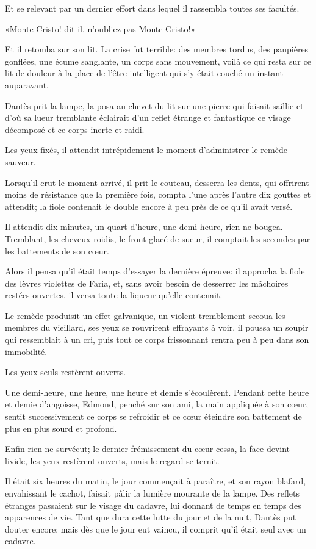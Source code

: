 Et se relevant par un dernier effort dans lequel il rassembla toutes ses facultés.

«Monte-Cristo! dit-il, n'oubliez pas Monte-Cristo!»

Et il retomba sur son lit. La crise fut terrible: des membres tordus, des paupières gonflées, une écume sanglante, un corps sans mouvement, voilà ce qui resta sur ce lit de douleur à la place de l'être intelligent qui s'y était couché un instant auparavant.

Dantès prit la lampe, la posa au chevet du lit sur une pierre qui faisait saillie et d'où sa lueur tremblante éclairait d'un reflet étrange et fantastique ce visage décomposé et ce corps inerte et raidi.

Les yeux fixés, il attendit intrépidement le moment d'administrer le remède sauveur.

Lorsqu'il crut le moment arrivé, il prit le couteau, desserra les dents, qui offrirent moins de résistance que la première fois, compta l'une après l'autre dix gouttes et attendit; la fiole contenait le double encore à peu près de ce qu'il avait versé.

Il attendit dix minutes, un quart d'heure, une demi-heure, rien ne bougea. Tremblant, les cheveux roidis, le front glacé de sueur, il comptait les secondes par les battements de son cœur.

Alors il pensa qu'il était temps d'essayer la dernière épreuve: il approcha la fiole des lèvres violettes de Faria, et, sans avoir besoin de desserrer les mâchoires restées ouvertes, il versa toute la liqueur qu'elle contenait.

Le remède produisit un effet galvanique, un violent tremblement secoua les membres du vieillard, ses yeux se rouvrirent effrayants à voir, il poussa un soupir qui ressemblait à un cri, puis tout ce corps frissonnant rentra peu à peu dans son immobilité.

Les yeux seuls restèrent ouverts.

Une demi-heure, une heure, une heure et demie s'écoulèrent. Pendant cette heure et demie d'angoisse, Edmond, penché sur son ami, la main appliquée à son cœur, sentit successivement ce corps se refroidir et ce cœur éteindre son battement de plus en plus sourd et profond.

Enfin rien ne survécut; le dernier frémissement du cœur cessa, la face devint livide, les yeux restèrent ouverts, mais le regard se ternit.

Il était six heures du matin, le jour commençait à paraître, et son rayon blafard, envahissant le cachot, faisait pâlir la lumière mourante de la lampe. Des reflets étranges passaient sur le visage du cadavre, lui donnant de temps en temps des apparences de vie. Tant que dura cette lutte du jour et de la nuit, Dantès put douter encore; mais dès que le jour eut vaincu, il comprit qu'il était seul avec un cadavre.

